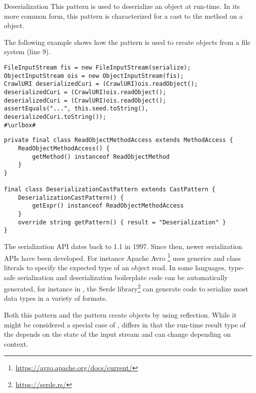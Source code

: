 \begin{pattern}{Deserialization}
This pattern is used to deserialize an object at run-time.
In its more common form,
this pattern is characterized for a cast to the  method on a  object.

\instances{}
The following example shows how the \thisp{} pattern is used to create objects from a file system (line 9).

\def\urlvar{http://bit.ly/internetarchive_heritrix3_2SF4j7k}
\begin{verbatim}
FileInputStream fis = new FileInputStream(serialize);
ObjectInputStream ois = new ObjectInputStream(fis);
CrawlURI deserializedCuri = (CrawlURI)ois.readObject();
deserializedCuri = (CrawlURI)ois.readObject();
deserializedCuri = (CrawlURI)ois.readObject();
assertEquals("...", this.seed.toString(), deserializedCuri.toString());
#\urlbox#
\end{verbatim}


\detection{}

\begin{lstlisting}[style=ql]
private final class ReadObjectMethodAccess extends MethodAccess {
    ReadObjectMethodAccess() {
        getMethod() instanceof ReadObjectMethod
    }
}

final class DeserializationCastPattern extends CastPattern {
    DeserializationCastPattern() {
        getExpr() instanceof ReadObjectMethodAccess
    }
    override string getPattern() { result = "Deserialization" }
}
\end{lstlisting}


\issues{}
The serialization API dates back to \java{} 1.1 in 1997.
Since then, newer serialization APIs have been developed.
For instance Apache Avro%
\footnote{\url{https://avro.apache.org/docs/current/}}
uses generics and class literals to specify the expected type of an object read. 
In some languages,
type-safe serialization and deserialization boilerplate code can be automatically generated,
for instance in \rust{},
the Serde library\footnote{\url{https://serde.rs/}}
can generate code to serialize most data types
in a variety of formats.

Both this pattern and the  pattern create objects by using reflection.
While it might be considered a special case of , 
\thisp{} differs in that the run-time result type of the  depends on the state of the input stream and can change depending on context.
 
\end{pattern}